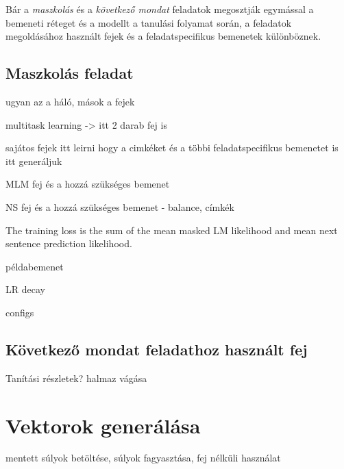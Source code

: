 Bár a \textit{maszkolás} és a \textit{következő mondat} feladatok megosztják egymással a bemeneti réteget és a modellt a tanulási folyamat során, a feladatok megoldásához használt fejek és a feladatspecifikus bemenetek különböznek.

\subsection{Maszkolás feladat}









\pagebreak

ugyan az a háló, mások a fejek

multitask learning -> itt 2 darab fej is

sajátos fejek
itt leirni hogy a cimkéket és a többi feladatspecifikus bemenetet is itt generáljuk

MLM
fej és a hozzá szükséges bemenet


NS
fej és a hozzá szükséges bemenet - balance, címkék

The training loss is the sum of the mean masked LM likelihood and mean next sentence prediction likelihood.

példabemenet

LR decay

configs





\subsection{Következő mondat feladathoz használt fej}

Tanítási részletek? halmaz vágása


\section{Vektorok generálása}
mentett súlyok betöltése, súlyok fagyasztása, fej nélküli használat